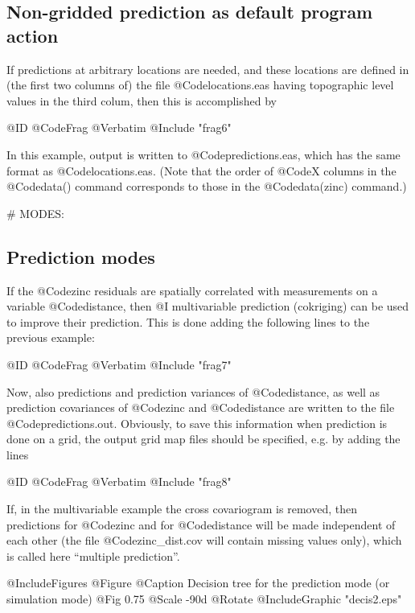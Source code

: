 \documentclass{article}
\begin{document}
\subsection{Non-gridded prediction as default program action}
If predictions at arbitrary locations are needed, and these locations
are defined in (the first two columns of) the file @Code{locations.eas}
having topographic level values in the third colum, then this is
accomplished by

@ID @CodeFrag { @Verbatim { @Include { "frag6" }}}

In this example, output is written to @Code{predictions.eas}, which has
the same format as @Code{locations.eas}. (Note that the order of @Code{X}
columns in the @Code{data()} command corresponds to those in the
@Code{data(zinc)} command.)

# MODES:
\subsection{Prediction modes}
If the @Code{zinc} residuals are spatially correlated with measurements
on a variable @Code{distance}, then @I multivariable prediction
(cokriging) can be used to improve their prediction. This is done
adding the following lines to the previous example:

@ID @CodeFrag { @Verbatim { @Include { "frag7" }}}

Now, also predictions and prediction variances of @Code{distance}, as
well as prediction covariances of @Code{zinc} and @Code{distance} are
written to the file @Code{predictions.out}. Obviously, to save this
information when prediction is done on a grid, the output grid map files
should be specified, e.g. by adding the lines

@ID @CodeFrag { @Verbatim { @Include { "frag8" }}}

If, in the multivariable example the cross covariogram is removed, then
predictions for @Code{zinc} and for @Code{distance} will be made
independent of each other (the file @Code{zinc_dist.cov} will contain
missing values only), which is called here ``multiple prediction''.

@IncludeFigures {
@Figure
 @Caption { Decision tree for the prediction mode (or simulation mode) }
{ @Fig { 0.75 @Scale -90d @Rotate @IncludeGraphic "decis2.eps" } }
}
\end{document}
